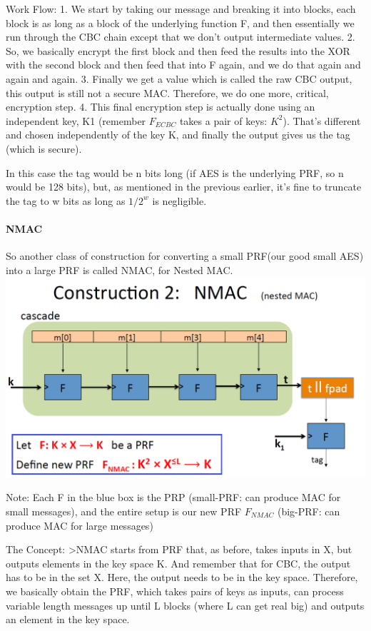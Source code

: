 \documentclass[11pt]{article}
\makeatletter
\def\maxwidth{\ifdim\Gin@nat@width>\linewidth\linewidth
    \else\Gin@nat@width\fi}
\let\Oldincludegraphics\includegraphics
\renewcommand{\includegraphics}[1]{\Oldincludegraphics[width=.8\maxwidth]{#1}}
\makeatother
\begin{document}
Work Flow: 1. We start by taking our message and breaking it into
blocks, each block is as long as a block of the underlying function F,
and then essentially we run through the CBC chain except that we don't
output intermediate values. 2. So, we basically encrypt the first block
and then feed the results into the XOR with the second block and then
feed that into F again, and we do that again and again and again. 3.
Finally we get a value which is called the raw CBC output, this output
is still not a secure MAC. Therefore, we do one more, critical,
encryption step. 4. This final encryption step is actually done using an
independent key, K1 (remember \(F_{ECBC}\) takes a pair of keys:
\(K^{2}\)). That's different and chosen independently of the key K, and
finally the output gives us the tag (which is secure).

In this case the tag would be n bits long (if AES is the underlying PRF,
so n would be 128 bits), but, as mentioned in the previous earlier, it's
fine to truncate the tag to w bits as long as \(1/2^{w}\) is negligible.

\hypertarget{nmac}{%
\paragraph{NMAC}\label{nmac}}

So another class of construction for converting a small PRF(our good
small AES) into a large PRF is called NMAC, for Nested MAC.
\includegraphics{./Images/NMAC.png}

Note: Each F in the blue box is the PRP (small-PRF: can produce MAC for
small messages), and the entire setup is our new PRF \(F_{NMAC}\)
(big-PRF: can produce MAC for large messages)

The Concept: \textgreater{}NMAC starts from PRF that, as before, takes
inputs in X, but outputs elements in the key space K. And remember that
for CBC, the output has to be in the set X. Here, the output needs to be
in the key space. Therefore, we basically obtain the PRF, which takes
pairs of keys as inputs, can process variable length messages up until L
blocks (where L can get real big) and outputs an element in the key
space.
\end{document}
